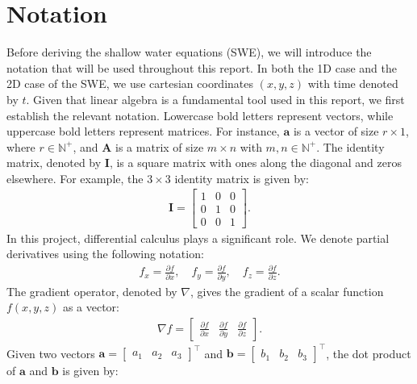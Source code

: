 \section{Notation}\label{sec:notation}
Before deriving the shallow water equations (SWE), we will introduce the notation that will be used throughout this report.
In both the 1D case and the 2D case of the SWE, we use cartesian coordinates $(x, y, z)$ with time denoted by $t$.
Given that linear algebra is a fundamental tool used in this report, we first establish the relevant notation.
Lowercase bold letters represent vectors, while uppercase bold letters represent matrices.
For instance, $\mathbf{a}$ is a vector of size $r \times 1$, where $r \in \mathbb{N}^+$, and $\mathbf{A}$ is a matrix of size $m \times n$ with $m,n \in \mathbb{N}^+$.
The identity matrix, denoted by $\mathbf{I}$, is a square matrix with ones along the diagonal and zeros elsewhere.
For example, the $3 \times 3$ identity matrix is given by:
\begin{align*}
    \mathbf{I} = \begin{bmatrix}
        1 & 0 & 0 \\
        0 & 1 & 0 \\
        0 & 0 & 1
    \end{bmatrix}.
\end{align*}
In this project, differential calculus plays a significant role.
We denote partial derivatives using the following notation:
\begin{align}\label{eq:notation_partial_derivatives}
   f_x =  \frac{\partial f}{\partial x}, \quad f_y = \frac{\partial f}{\partial y}, \quad f_z = \frac{\partial f}{\partial z}.
\end{align}
The gradient operator, denoted by $\nabla$, gives the gradient of a scalar function $f(x,y,z)$ as a vector:
\begin{align*}
    \nabla f = \begin{bmatrix}
        \frac{\partial f}{\partial x} &
        \frac{\partial f}{\partial y} &
        \frac{\partial f}{\partial z}
    \end{bmatrix}.
\end{align*}
Given two vectors $\mathbf{a} = \begin{bmatrix}
    a_1 & a_2 & a_3
\end{bmatrix}^\top $ and $\mathbf{b} = \begin{bmatrix}
    b_1 & b_2 & b_3
\end{bmatrix}^\top$, the dot product of $\mathbf{a}$ and $\mathbf{b}$ is given by:

